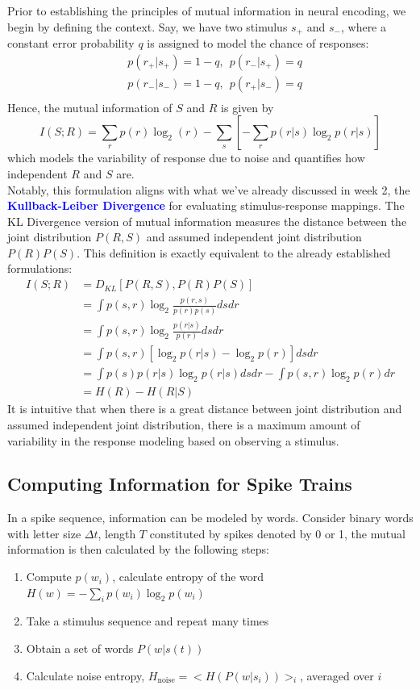\documentclass[11pt]{article}
\begin{document}
Prior to establishing the principles of mutual information in neural encoding, we begin by defining the context. Say, we have two stimulus $s_+$ and $s_-$, where a constant error probability $q$ is assigned to model the chance of responses:
\begin{align*}
    &p(r_+|s_+)=1-q, \ \ p(r_-|s_+)=q\\
    &p(r_-|s_-)=1-q, \ \ p(r_+|s_-)=q\\
\end{align*}
Hence, the mutual information of $S$ and $R$ is given by
\[I(S; R)=\sum_r p(r)\log_2 (r)-\sum_s[-\sum_r p(r|s)\log_2p(r|s)]\]
which models the variability of response due to noise and quantifies how independent $R$ and $S$ are. 
\\

Notably, this formulation aligns with what we've already discussed in week 2, the \textcolor{Blue}{\textbf{Kullback-Leiber Divergence}} for evaluating stimulus-response mappings. The KL Divergence version of mutual information measures the distance between the joint distribution $P(R,S)$ and assumed independent joint distribution $P(R)P(S)$. This definition is exactly equivalent to the already established formulations:
\begin{align*}
    I(S; R)&=D_{KL}[P(R,S), P(R)P(S)]\\
    &=\int p(s,r)\log_2 \frac{p(r,s)}{p(r)p(s)}dsdr\\
    &=\int p(s,r)\log_2 \frac{p(r|s)}{p(r)}dsdr\\
    &=\int p(s,r)[\log_2 p(r|s)-\log_2 p(r)]dsdr\\
    &=\int p(s)p(r|s)\log_2 p(r|s)dsdr-\int p(s,r)\log_2 p(r)dr\\
    &=H(R)-H(R|S)
\end{align*}
It is intuitive that when there is a great distance between joint distribution and assumed independent joint distribution, there is a maximum amount of variability in the response modeling based on observing a stimulus.
\subsection{Computing Information for Spike Trains}
In a spike sequence, information can be modeled by words. Consider binary words with letter size $\Delta t$, length $T$ constituted by spikes denoted by 0 or 1, the mutual information is then calculated by the following steps:
\begin{enumerate}
    \item Compute $p(w_i)$, calculate entropy of the word $H(w)=-\sum_i p(w_i)\log_2 p(w_i)$
    \item Take a stimulus sequence and repeat many times
    \item Obtain a set of words $P(w|s(t))$
    \item Calculate noise entropy, $H_{\text{noise}}=<H(P(w|s_i))>_i$, averaged over $i$
\end{enumerate}
\end{document}
